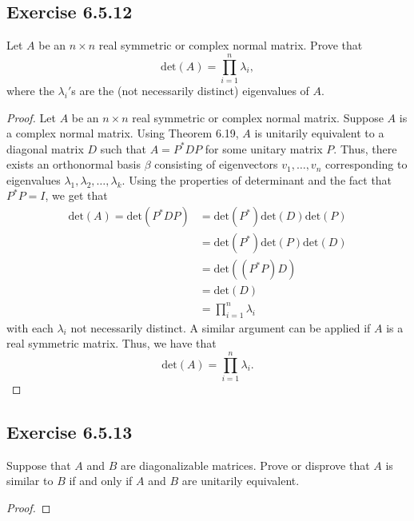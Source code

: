 \subsection*{Exercise 6.5.12} Let \( A  \) be an \( n \times n  \) real symmetric or complex normal matrix. Prove that 
\[  \text{det}(A) = \prod_{i=1}^{n} {\lambda}_{i}, \]
where the \( {\lambda}_{i}' \)s are the (not necessarily distinct) eigenvalues of \( A  \).
\begin{proof}

    Let \( A  \) be an \( n \times n  \) real symmetric or complex normal matrix. Suppose \( A  \) is a complex normal matrix. Using Theorem 6.19, \( A  \) is unitarily equivalent to a diagonal matrix \( D  \) such that  \( A =P^{*} D P  \) for some unitary matrix \( P  \). Thus, there exists an orthonormal basis \( \beta  \) consisting of eigenvectors \( {v}_{1}, \dots, {v}_{n} \) corresponding to eigenvalues \( {\lambda}_{1}, {\lambda}_{2}, \dots, {\lambda}_{k}   \). Using the properties of determinant and the fact that \( P^{*}P = I  \), we get that
    \begin{align*}
       \text{det}(A) = \text{det}(P^{*}D P)  &= \text{det}(P^{*}) \text{det}(D) \text{det}(P) \\
                                             &= \text{det}(P^{*})\text{det}(P) \text{det}(D) \\ 
                                             &= \text{det}((P^{*}P)D) \\
                                             &= \text{det}(D) \\
                                             &=  \prod_{i=1}^{n} {\lambda}_{i}
    \end{align*}
    with each \( {\lambda}_{i} \) not necessarily distinct. A similar argument can be applied if \( A  \) is a real symmetric matrix. Thus, we have that
    \[  \text{det}(A) = \prod_{i=1}^{n} {\lambda}_{i}. \]
\end{proof}

\subsection*{Exercise 6.5.13} Suppose that \( A  \) and \( B  \) are diagonalizable matrices. Prove or disprove that \( A  \) is similar to \( B  \) if and only if \( A  \) and \( B  \) are unitarily equivalent. 
\begin{proof}

\end{proof}

